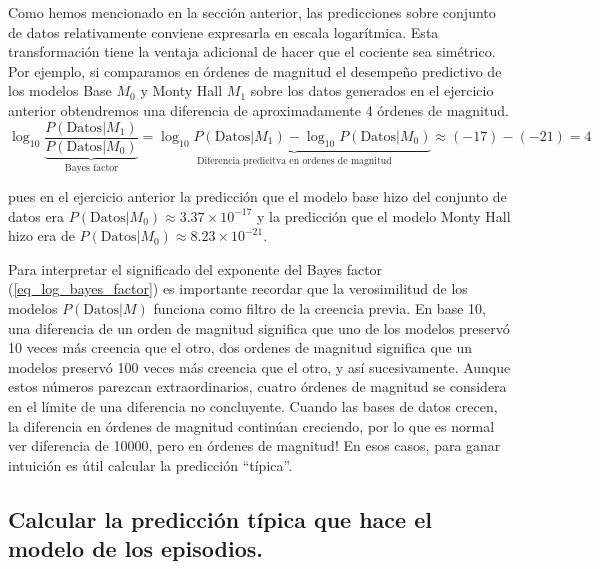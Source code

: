 \documentclass[a4paper,10pt]{article}
\begin{document}

Como hemos mencionado en la sección anterior, las predicciones sobre conjunto de datos relativamente conviene expresarla en escala logarítmica.
%
Esta transformación tiene la ventaja adicional de hacer que el cociente sea simétrico.
%
Por ejemplo, si comparamos en órdenes de magnitud el desempeño predictivo de los modelos Base $M_0$ y Monty Hall $M_1$ sobre los datos generados en el ejercicio anterior obtendremos una diferencia de aproximadamente 4 órdenes de magnitud.
%
\begin{equation}\label{eq_log_bayes_factor}
\log_{10} \underbrace{\frac{P(\text{Datos}|M_1)}{P(\text{Datos}|M_0)}}_{\text{Bayes factor}}  = \underbrace{\log_{10} P(\text{Datos}|M_1) - \log_{10}P(\text{Datos}|M_0)}_{\text{Diferencia predicitva en ordenes de magnitud}} \approx (-17) - (-21) = 4
\end{equation}

pues en el ejercicio anterior la predicción que el modelo base hizo del conjunto de datos era $P(\text{Datos}|M_0) \approx 3.37\times10^{-17}$ y la predicción que el modelo Monty Hall hizo era de $P(\text{Datos}|M_0) \approx 8.23\times10^{-21}$.

\vspace{0.3cm}

Para interpretar el significado del exponente del Bayes factor (\ref{eq_log_bayes_factor}) es importante recordar que la verosimilitud de los modelos $P(\text{Datos}|M)$ funciona como filtro de la creencia previa.
En base 10, una diferencia de un orden de magnitud significa que uno de los modelos preservó 10 veces más creencia que el otro, dos ordenes de magnitud significa que un modelos preservó 100 veces más creencia que el otro, y así sucesivamente.
Aunque estos números parezcan extraordinarios, cuatro órdenes de magnitud se considera en el límite de una diferencia no concluyente.
Cuando las bases de datos crecen, la diferencia en órdenes de magnitud continúan creciendo, por lo que es normal ver diferencia de 10000, pero en órdenes de magnitud!
En esos casos, para ganar intuición es útil calcular la predicción ``típica''.

\subsection{Calcular la predicción típica que hace el modelo de los episodios.}
\end{document}
